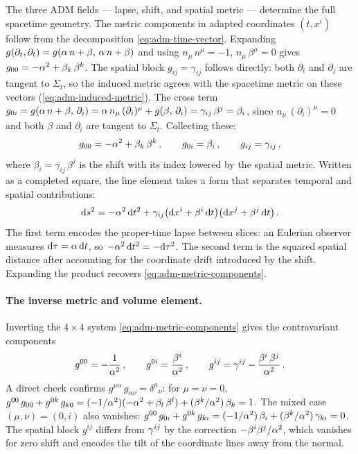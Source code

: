The three ADM fields --- lapse, shift, and spatial metric --- determine
the full spacetime geometry.  The metric components in adapted
coordinates $(t, x^i)$ follow from the decomposition
\cref{eq:adm-time-vector}.  Expanding
$g(\partial_t, \partial_t) = g(\alpha\,n + \beta,\,\alpha\,n + \beta)$
and using $n_\mu\,n^\mu = -1$, $n_\mu\,\beta^\mu = 0$ gives
$g_{00} = -\alpha^2 + \beta_k\,\beta^k$.  The spatial block
$g_{ij} = \gamma_{ij}$ follows directly: both $\partial_i$ and
$\partial_j$ are tangent to $\Sigma_t$, so the induced metric agrees
with the spacetime metric on these vectors
(\cref{eq:adm-induced-metric}).  The cross term
$g_{0i} = g(\alpha\,n + \beta,\,\partial_i)
= \alpha\,n_\mu\,(\partial_i)^\mu + g(\beta,\,\partial_i)
= \gamma_{ij}\,\beta^j = \beta_i$,
since $n_\mu\,(\partial_i)^\mu = 0$ and both $\beta$ and $\partial_i$
are tangent to $\Sigma_t$.  Collecting these:
%
\begin{equation}
  g_{00} = -\alpha^2 + \beta_k\,\beta^k \,,\qquad
  g_{0i} = \beta_i \,,\qquad
  g_{ij} = \gamma_{ij} \,,
  \label{eq:adm-metric-components}
\end{equation}
%
where $\beta_i = \gamma_{ij}\,\beta^j$ is the shift with its index
lowered by the spatial metric.  Written as a completed square, the
line element takes a form that separates temporal and spatial
contributions:
%
\begin{equation}
  \mathrm{d} s^2 = -\alpha^2\,\mathrm{d} t^2
    + \gamma_{ij}\bigl(\mathrm{d} x^i + \beta^i\,\mathrm{d} t\bigr)
                  \bigl(\mathrm{d} x^j + \beta^j\,\mathrm{d} t\bigr) \,.
  \label{eq:adm-line-element}
\end{equation}
%
The first term encodes the proper-time lapse between slices: an
Eulerian observer measures $\mathrm{d}\tau = \alpha\,\mathrm{d} t$, so
$-\alpha^2\,\mathrm{d} t^2 = -\mathrm{d}\tau^2$.  The second term is the squared
spatial distance after accounting for the coordinate drift introduced
by the shift.  Expanding the product recovers
\cref{eq:adm-metric-components}.

\paragraph{The inverse metric and volume element.}

Inverting the $4 \times 4$ system \cref{eq:adm-metric-components} gives
the contravariant components
%
\begin{equation}
  g^{00} = -\frac{1}{\alpha^2} \,,\qquad
  g^{0i} = \frac{\beta^i}{\alpha^2} \,,\qquad
  g^{ij} = \gamma^{ij} - \frac{\beta^i\,\beta^j}{\alpha^2} \,.
  \label{eq:adm-inverse-metric}
\end{equation}
%
A direct check confirms $g^{\mu\alpha}\,g_{\alpha\nu}
= \delta^\mu{}_\nu$: for $\mu = \nu = 0$,
$g^{00}\,g_{00} + g^{0k}\,g_{k0}
= (-1/\alpha^2)(-\alpha^2 + \beta_l\,\beta^l)
  + (\beta^k/\alpha^2)\,\beta_k = 1$.
The mixed case $(\mu,\nu) = (0,i)$ also vanishes:
$g^{00}\,g_{0i} + g^{0k}\,g_{ki}
= (-1/\alpha^2)\,\beta_i + (\beta^k/\alpha^2)\,\gamma_{ki}
= 0$.
The spatial block $g^{ij}$ differs from $\gamma^{ij}$ by the
correction $-\beta^i\beta^j/\alpha^2$, which vanishes for zero shift
and encodes the tilt of the coordinate lines away from the normal.

